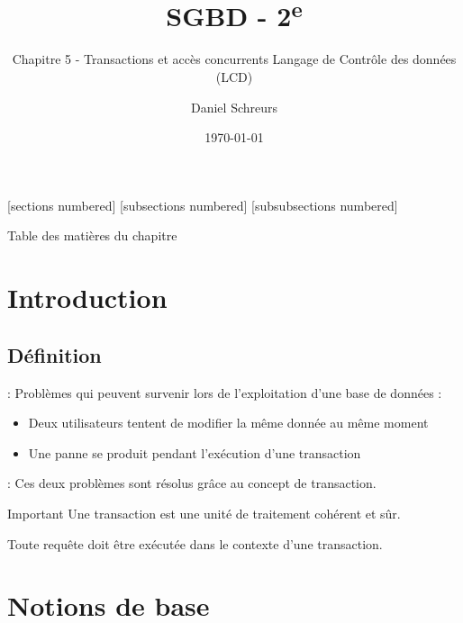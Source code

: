 \documentclass[10pt]{beamer}
\title{SGBD - 2\textsuperscript{e}}
\subtitle{Chapitre 5 - Transactions et accès concurrents Langage de Contrôle des données (LCD)}
\date{\today}
\author{Daniel Schreurs}
\institute{Haute École de Province de Liège}
\begin{document}
\maketitle

[sections numbered]
[subsections numbered]
[subsubsections numbered]
\begin{frame}[allowframebreaks]{Table des matières du chapitre}
    \tableofcontents[subsectionstyle=show/show/hide,subsubsectionstyle=show/show/hide,]
\end{frame}

\section{Introduction}
\tocss
\subsection{Définition}
\begin{frame}{\secname : \subsecname}
    Problèmes qui peuvent survenir lors de l'exploitation d'une base de données :
    \begin{itemize}
        \item Deux utilisateurs tentent de modifier la même donnée au même moment
        \item Une panne se produit pendant l'exécution d'une transaction
    \end{itemize}
\end{frame}

\begin{frame}{\secname : \subsecname}
    Ces deux problèmes sont résolus grâce au concept de transaction.
    \begin{alertblock}{Important}
        Une transaction est une unité de traitement cohérent et sûr.
    \end{alertblock}
    Toute requête doit être exécutée dans le contexte d'une transaction.
\end{frame}
\section{Notions de base}
\tocss
\end{document}
